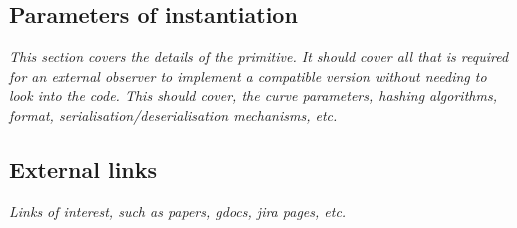 \subsection{Parameters of instantiation}
\label{sec:parameters}
\textit{This section covers the details of the primitive. It should cover all that is required for an external observer to implement a compatible version without needing to look into the code. This should cover, the curve parameters, hashing algorithms, format, serialisation/deserialisation mechanisms, etc.}

\subsection{External links}
\textit{Links of interest, such as papers, gdocs, jira pages, etc.}
